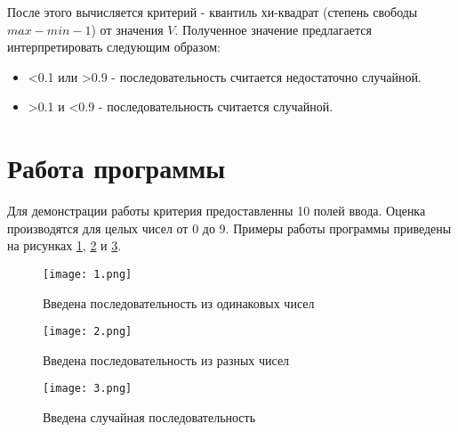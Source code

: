 	После этого вычисляется критерий - квантиль хи-квадрат (степень свободы $max - min - 1$) от значения $V$. Полученное значение предлагается интерпретировать следующим образом:
	\begin{itemize}
		\item <0.1 или >0.9 - последовательность считается недостаточно случайной.
		\item >0.1 и <0.9 - последовательность считается случайной.
	\end{itemize}

\section{Работа программы}
	Для демонстрации работы критерия предоставленны 10 полей ввода. Оценка производятся для целых чисел от 0 до 9. Примеры работы программы приведены на рисунках \ref{pic:1}, \ref{pic:2} и \ref{pic:3}.
	
	\begin{figure}[h]
		\begin{center}
			{\texttt{[image: 1.png]}
			\caption{Введена последовательность из одинаковых чисел}
			\label{pic:1}}
		\end{center}
	\end{figure}

	\begin{figure}[h]
		\begin{center}
			{\texttt{[image: 2.png]}
			\caption{Введена последовательность из разных чисел}
			\label{pic:2}}
		\end{center}
	\end{figure}
	
	\begin{figure}[h]
		\begin{center}
			{\texttt{[image: 3.png]}
			\caption{Введена случайная последовательность}
			\label{pic:3}}
		\end{center}
	\end{figure}
